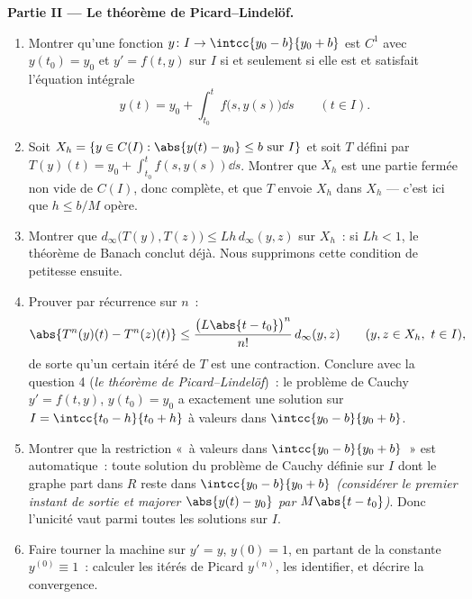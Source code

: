 \begin{problem}
\medskip
\noindent\textbf{Partie II --- Le théorème de Picard--Lindelöf.}
\begin{enumerate}[resume]
  \item Montrer qu'une fonction $y \colon I \to \intcc{y_0 - b}{y_0 +
        b}$ est $C^1$ avec $y(t_0) = y_0$ et $y' = f(t, y)$ sur $I$
        si et seulement si elle est  et satisfait l'équation
        intégrale
        \[
        y(t) = y_0 + \int_{t_0}^{t} f\bigl(s, y(s)\bigr)\dd s
        \qquad (t \in I).
        \]
  \item Soit $X_h = \{y \in C(I) : \abs{y(t) - y_0} \leq b
        \text{ sur } I\}$ et soit $T$ défini par $T(y)(t) = y_0 +
        \int_{t_0}^{t}f(s, y(s))\dd s$. Montrer que $X_h$ est une
        partie fermée non vide de $C(I)$, donc complète, et que $T$
        envoie $X_h$ dans $X_h$ --- c'est ici que $h \leq b/M$
        opère.
  \item Montrer que $d_\infty\bigl(T(y), T(z)\bigr) \leq
        Lh\,d_\infty(y, z)$ sur $X_h$~: si $Lh < 1$, le théorème de
        Banach conclut déjà. Nous supprimons cette condition de
        petitesse ensuite.
  \item Prouver par récurrence sur $n$~:
        \[
        \abs{T^n(y)(t) - T^n(z)(t)} \leq
        \frac{\bigl(L\abs{t - t_0}\bigr)^n}{n!}\,
        d_\infty(y, z) \qquad (y, z \in X_h,\ t \in I),
        \]
        de sorte qu'un certain itéré de $T$ est une contraction.
        Conclure avec la question 4 (\emph{le théorème de
        Picard--Lindelöf})~: le problème de Cauchy $y' = f(t,y)$,
        $y(t_0) = y_0$ a exactement une solution sur $I =
        \intcc{t_0 - h}{t_0 + h}$ à valeurs dans $\intcc{y_0 -
        b}{y_0 + b}$.
  \item Montrer que la restriction «~à valeurs dans $\intcc{y_0 -
        b}{y_0 + b}$~» est automatique~: toute solution du problème
        de Cauchy définie sur $I$ dont le graphe part dans $R$ reste
        dans $\intcc{y_0 - b}{y_0 + b}$ \emph{(considérer le premier
        instant de sortie et majorer $\abs{y(t) - y_0}$ par
        $M\abs{t - t_0}$)}. Donc l'unicité vaut parmi toutes les
        solutions sur $I$.
  \item Faire tourner la machine sur $y' = y$, $y(0) = 1$, en
        partant de la constante $y^{(0)} \equiv 1$~: calculer les
        itérés de Picard $y^{(n)}$, les identifier, et décrire la
        convergence.
\end{enumerate}


\end{problem}
